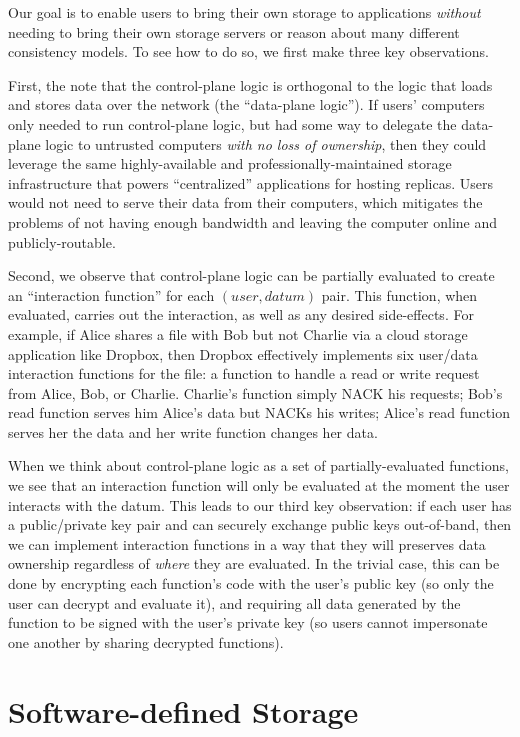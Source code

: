 Our goal is to enable users to bring their own storage to applications
\emph{without} needing to bring their own storage servers or reason about many
different consistency models.  To see how to do so,
we first make three key observations.

First, the note that the control-plane logic is
orthogonal to the logic that loads and stores data over the network (the ``data-plane logic'').
If users' computers only needed to run control-plane logic, but had some way to
delegate the data-plane logic to untrusted computers \emph{with no loss of
ownership}, then they could leverage the same highly-available and professionally-maintained storage
infrastructure that powers ``centralized'' applications for hosting replicas.
Users would not need to serve their data from their computers, which mitigates
the problems of not having enough bandwidth and leaving the computer online and
publicly-routable.

Second, we observe that control-plane logic can be partially evaluated to create
an ``interaction function'' for each $(user, datum)$ pair.  This function, when
evaluated, carries out the interaction, as well as any desired side-effects.
For example, if Alice shares a file with Bob but not Charlie
via a cloud storage application like Dropbox, then Dropbox effectively
implements six user/data interaction functions for the file: a function to handle a
read or write request from Alice, Bob, or Charlie.  Charlie's function simply NACK his
requests; Bob's read function serves him Alice's data but NACKs his writes;
Alice's read function serves her the data and her write function changes her data.

When we think about control-plane logic as a set of partially-evaluated
functions, we see that an interaction function will only be evaluated at the moment the user interacts
with the datum.  This leads to our third key observation:  if each user has a
public/private key pair and can securely exchange public keys out-of-band, then we can
implement interaction functions in a way that they will
preserves data ownership regardless of \emph{where} they are evaluated.
In the trivial case, this can be done by encrypting each function's code with the user's
public key (so only the user can decrypt and evaluate it), and requiring all data
generated by the function to be signed with the user's private key (so users
cannot impersonate one another by sharing decrypted functions).

\section{Software-defined Storage}

